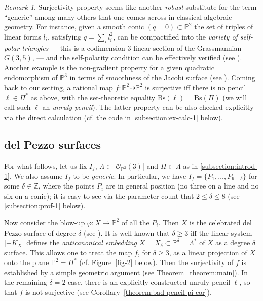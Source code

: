 \documentclass[14pt]{amsart}
\theoremstyle{definition}
\theoremstyle{remark}
\newtheorem{remark}[equation]{Remark}
\newcommand{\p}{\mathbb{P}}
\newcommand{\cel}{\mathbb{Z}}
\newcommand{\map}{\longrightarrow}
\begin{document}
\begin{remark}
\label{remark:surj-robust} Surjectivity property seems like
another \emph{robust} substitute for the term ``generic'' among
many others that one comes across in classical algebraic geometry.
For instance, given a smooth conic $(q = 0) \subset \p^2$ the set
of triples of linear forms $l_i$, satisfying $q =
\displaystyle\sum_i l_i^2$, can be compactified into the
\emph{variety of self-polar triangles}
--- this is a codimension $3$ linear section of the Grassmannian
$G(3,5)$, --- and the self-polarity condition can be effectively
verified (see \cite[{\bf 2.1.3}]{Dol-CAG}). Another example is the
non-gradient property for a given quadratic endomorphism of $\p^3$
in terms of smoothness of the Jacobi surface (see
\cite{Ilya-non-grad}). Coming back to our setting, a rational map
$f: \p^2 \dashrightarrow \p^2$ is surjective iff there is no
pencil $\ell \in \Pi^*$ as above, with the set-theoretic equality
$\text{Bs}(\ell) = \text{Bs}(\Pi)$ (we will call such $\ell$ an
\emph{unruly pencil}). The latter property can be also checked
explicitly via the direct calculation (cf. the code in
{\ref{subsection:ex-calc-1}} below).
\end{remark}

\subsection{del Pezzo surfaces}
\label{subsection:introd-2}

For what follows, let us fix $I_f$, $\Lambda \subset
|\mathcal{O}_{\p^2}(3)|$ and $\Pi \subset \Lambda$ as in
{\ref{subsection:introd-1}}. We also assume $I_f$ to be
\emph{generic}. In particular, we have $I_f = \{P_1,\ldots,P_{9 -
\delta}\}$ for some $\delta \in \cel$, where the points $P_i$ are
in general position (no three on a line and no six on a conic); it
is easy to see via the parameter count that $2 \le \delta \le 8$
(see {\ref{subsection:prof-1}} below).

Now consider the blow-up $\varphi: X \map \p^2$ of all the $P_i$.
Then $X$ is the celebrated del Pezzo surface of degree $\delta$
(see \cite[Ch.\,8]{Dol-CAG}). It is well-known that $\delta \ge 3$
iff the linear system $|-K_X|$ defines the \emph{anticanonical
embedding} $X = X_{\delta} \subset \p^{\delta} = \Lambda^*$ of $X$
as a degree $\delta$ surface. This allows one to treat the map
$f$, for $\delta \ge 3$, as a linear projection of $X$ onto the
plane $\p^2 = \Pi^*$ (cf. Figure~\ref{fig-2} below). Then the
surjectivity of $f$ is established by a simple geometric argument
(see Theorem~\ref{theorem:main}). In the remaining $\delta = 2$
case, there is an explicitly constructed unruly pencil $\ell$, so
that $f$ is not surjective (see
Corollary~\ref{theorem:bad-pencil-pi-cor}).
\end{document}
